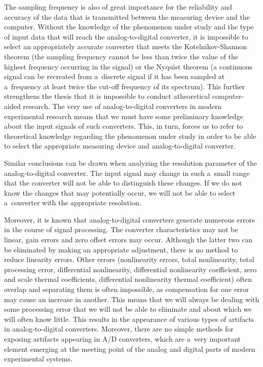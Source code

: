 The sampling frequency is also of great importance for the reliability and accuracy of the data that is transmitted between the measuring device and the computer. Without the knowledge of the phenomenon under study and the type of input data that will reach the analog-to-digital converter, it is impossible to select an appropriately accurate converter that meets the Kotelnikov-Shannon theorem (the sampling frequency cannot be less than twice the value of the highest frequency occurring in the signal) or the Nyquist theorem (a continuous signal can be recreated from a~discrete signal if it has been sampled at a~frequency at least twice the cut-off frequency of its spectrum). This further strengthens the thesis that it is impossible to conduct atheoretical computer-aided research. The very use of analog-to-digital converters in modern experimental research means that we must have some preliminary knowledge about the input signals of such converters. This, in turn, forces us to refer to theoretical knowledge regarding the phenomenon under study in order to be able to select the appropriate measuring device and analog-to-digital converter.



Similar conclusions can be drawn when analyzing the resolution parameter of the analog-to-digital converter. The input signal may change in such a~small range that the converter will not be able to distinguish these changes. If we do not know the changes that may potentially occur, we will not be able to select a~converter with the appropriate resolution.



Moreover, it is known that analog-to-digital converters generate numerous errors in the course of signal processing. The converter characteristics may not be linear, gain errors and zero offset errors may occur. Although the latter two can be eliminated by making an appropriate adjustment, there is no method to reduce linearity errors. Other errors (nonlinearity errors, total nonlinearity, total processing error, differential nonlinearity, differential nonlinearity coefficient, zero and scale thermal coefficients, differential nonlinearity thermal coefficient) often overlap and separating them is often impossible, as compensation for one error may cause an increase in another. This means that we will always be dealing with some processing error that we will not be able to eliminate and about which we will often know little. This results in the appearance of various types of artifacts in analog-to-digital converters. Moreover, there are no simple methods for exposing artifacts appearing in A/D converters, which are a~very important element emerging at the meeting point of the analog and digital parts of modern experimental systems.



